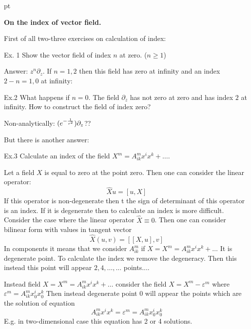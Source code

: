 
    pt

\def\V {{\cal V}}
\def\s {{\sigma}}
\def\Q {{\bf Q}}
\def\D {{\cal D}}
\def\G {{\Gamma}}
\def\C {{\bf C}}
\def\M {{\cal M}}
\def\Z {{\bf Z}}
\def\U  {{\cal U}}
\def\H {{\cal H}}
\def\R  {{\bf R}}
\def\l {\lambda}
\def\p {\partial}
\def\r {{\bf r}}
\def\v {{\bf v}}
\def\n {{\bf n}}
\def\t {{\bf t}}
\def\b {{\bf b}}
\def\ac {{\bf a}}
\def \X   {{\bf X}}
\def \Y   {{\bf Y}}
\def \E   {{\bf E}}
\def \N   {{\bf N}}
\def\b {{\beta}}
\def\CP {{\bf CP}}
\def\vare{\varepsilon}
    {\bf On the index of vector field.}

First of all  two-three exercises on calculation of index:

Ex. 1 Show the vector field of index $n$ at zero. ($n\geq 1$)

  Answer:  $z^n\p_z$. If $n=1,2$ then this field has zero at infinity and
   an index $2-n=1,0$ at infinity:


Ex.2   What happens if $n=0$. The field $\p_z$ has not zero at zero and has index $2$
at infinity. How to construct the field of index zero?

Non-analytically: $(e^{-{1\over r^2}})\p_z$??

But there is another answer:

Ex.3 Calculate an index of the field
$X^m=A^m_{ik}x^ix^k+\dots$.


Let a field $X$ is equal to zero at the point zero. Then one can consider
the linear operator:
                  $$
          \hat X u=[u,X]
                   $$
If this operator is non-degenerate then t
 the sign of determinant of this operator is an index.
If it is degenerate then to calculate an index is more difficult.
Consider the case where the linear operator $\hat X\equiv 0$. Then one can consider bilinear
form with values in tangent vector
                   $$
       \hat X(u,v)=\left[\left[X,u\right],v\right]
                   $$
In components it means that we consider $A^m_{ik}$ if $X=X^m=A^m_{ik}x^ix^k+\dots$
It is degenerate point. To calculate the index we remove the degeneracy.
Then this instead this point will appear $2,4,\dots,...$ points....

Instead field $X=X^m=A^m_{ik}x^ix^k+\dots$  consider the field
$X=X^m-\vare^m$ where $\vare^m=A^m_{ik}x_0^ix_0^k$ Then instead degenerate
point $0$ will appear the points which are the solution of equation
                   $$
                  A^m_{ik}x^ix^k=\vare^m=A^m_{ik}x^i_0x^k_0
                     $$
   E.g. in two-dimensional case this equation has 2 or 4 solutions.


